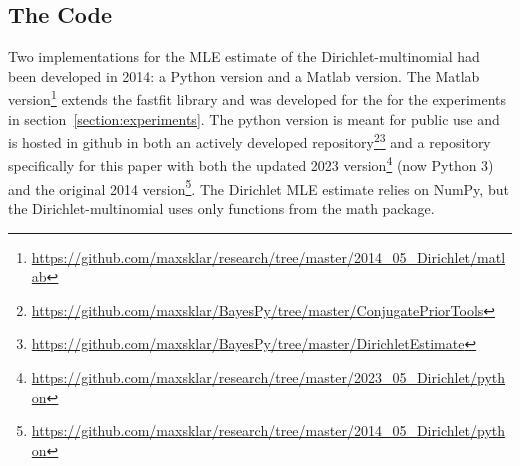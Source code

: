 \documentclass[twoside]{article}
\begin{document}
\subsection{The Code}
\label{code}

Two implementations for the MLE estimate of the Dirichlet-multinomial had been developed in 2014: a Python version and a Matlab version. The Matlab version\footnote{\url{https://github.com/maxsklar/research/tree/master/2014\_05\_Dirichlet/matlab}} extends the fastfit library and was developed for the for the experiments in section~\ref{section:experiments}. The python version is meant for public use and is hosted in github in both an actively developed repository\footnote{\url{https://github.com/maxsklar/BayesPy/tree/master/ConjugatePriorTools}}\footnote{\url{https://github.com/maxsklar/BayesPy/tree/master/DirichletEstimate}} and a repository specifically for this paper with both the updated 2023 version\footnote{\url{https://github.com/maxsklar/research/tree/master/2023\_05\_Dirichlet/python}} (now Python 3) and the original 2014 version\footnote{\url{https://github.com/maxsklar/research/tree/master/2014\_05\_Dirichlet/python}}. The Dirichlet MLE estimate relies on NumPy, but the Dirichlet-multinomial uses only functions from the math package. 

\end{document}
